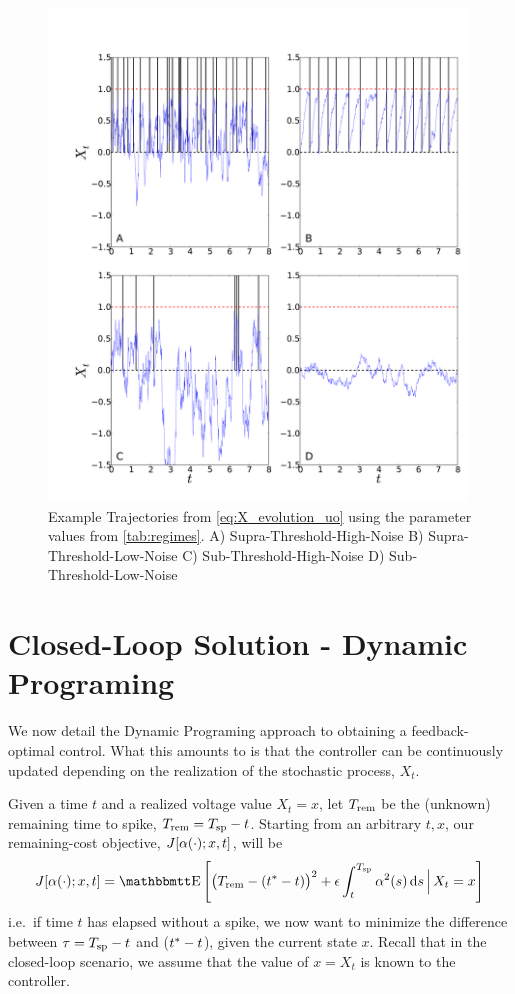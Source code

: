 \documentclass{article}
\begin{document}
\begin{figure}[htp]
\begin{center} 
  \includegraphics[width=0.99\textwidth]{Figs/PathSimulator/path_T=14_combined.pdf}
  \caption[labelInTOC]{Example Trajectories from \cref{eq:X_evolution_uo}
  using the parameter values from \cref{tab:regimes}. A)
  Supra-Threshold-High-Noise B) Supra-Threshold-Low-Noise C) Sub-Threshold-High-Noise D) Sub-Threshold-Low-Noise}
  \label{fig:regime_path_examples} 
\end{center} 
\end{figure} 

\section{Closed-Loop Solution - Dynamic Programing} 
We now detail the Dynamic Programing approach to obtaining a feedback-optimal
control. What this amounts to is that the controller can be continuously updated
depending on the realization of the stochastic process, $X_t$.

Given a time $t$ and a realized voltage value $X_t = x$, let ${ T_{\textrm{rem} } }$ be the
(unknown) remaining time to spike, ${ T_{\textrm{rem} } } = { T_{\textrm{sp} } } - t$. 
Starting from an arbitrary $t, x$, our remaining-cost
objective, $J[{\alpha}(\cdot); x,t]$, will be
\begin{equation}
J[\a(\cdot); x,t]  = 
\Exp\left[
\big(\trem - (\T-t) \big)^2 
+
\e \int_t^\ts  \a^2(s) \intd{s}
\,\Big|\, X_t = x
\right] 
\label{eq:OC_LS_cost_to_go}
\end{equation}
i.e.\ if time $t$ has elapsed without a spike, we now want to minimize
the difference between ${\tau} = { T_{\textrm{sp} } } - t$ and (${ t^* }-t$), given the current state $x$.
Recall that in the closed-loop scenario, we assume that the value of $x = X_t$
is known to the controller.
\end{document}
